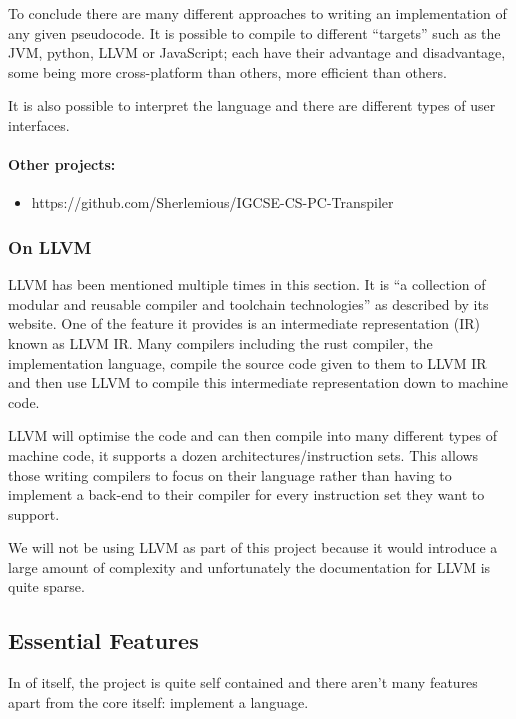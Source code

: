 \documentclass{article}
\begin{document}
To conclude there are many different approaches to writing an implementation of
any given pseudocode. It is possible to compile to different ``targets'' such
as the JVM, python, LLVM or JavaScript; each have their advantage and
disadvantage, some being more cross-platform than others, more efficient than
others.

It is also possible to interpret the language and there are different types of
user interfaces.

\paragraph{Other projects:}

\begin{itemize}
    \item{https://github.com/Sherlemious/IGCSE-CS-PC-Transpiler}
\end{itemize}

\subsubsection{On LLVM}

LLVM has been mentioned multiple times in this section. It is ``a collection of
modular and reusable compiler and toolchain technologies'' as described by its
website. One of the feature it provides is an intermediate representation (IR)
known as LLVM IR. Many compilers including the rust compiler, the
implementation language, compile the source code given to them to LLVM IR and
then use LLVM to compile this intermediate representation down to machine code.

LLVM will optimise the code and can then compile into many different types of
machine code, it supports a dozen architectures/instruction sets. This allows
those writing compilers to focus on their language rather than having to
implement a back-end to their compiler for every instruction set they want to
support.

We will not be using LLVM as part of this project because it would introduce a
large amount of complexity and unfortunately the documentation for LLVM is
quite sparse.

\subsection{Essential Features}

In of itself, the project is quite self contained and there aren't many
features apart from the core itself: implement a language.
\end{document}
